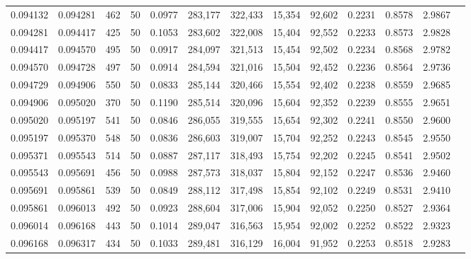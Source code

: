 \begin{tabular}{rrrrrrrrrrrrr}
0.094132 & 0.094281 &   462 &  50 &                                     0.0977 & 283,177 & 322,433 &  15,354 &  92,602 & 0.2231 & 0.8578 & 2.9867 \\
0.094281 & 0.094417 &   425 &  50 &                                     0.1053 & 283,602 & 322,008 &  15,404 &  92,552 & 0.2233 & 0.8573 & 2.9828 \\
0.094417 & 0.094570 &   495 &  50 &                                     0.0917 & 284,097 & 321,513 &  15,454 &  92,502 & 0.2234 & 0.8568 & 2.9782 \\
0.094570 & 0.094728 &   497 &  50 &                                     0.0914 & 284,594 & 321,016 &  15,504 &  92,452 & 0.2236 & 0.8564 & 2.9736 \\
0.094729 & 0.094906 &   550 &  50 &                                     0.0833 & 285,144 & 320,466 &  15,554 &  92,402 & 0.2238 & 0.8559 & 2.9685 \\
0.094906 & 0.095020 &   370 &  50 &                                     0.1190 & 285,514 & 320,096 &  15,604 &  92,352 & 0.2239 & 0.8555 & 2.9651 \\
0.095020 & 0.095197 &   541 &  50 &                                     0.0846 & 286,055 & 319,555 &  15,654 &  92,302 & 0.2241 & 0.8550 & 2.9600 \\
0.095197 & 0.095370 &   548 &  50 &                                     0.0836 & 286,603 & 319,007 &  15,704 &  92,252 & 0.2243 & 0.8545 & 2.9550 \\
0.095371 & 0.095543 &   514 &  50 &                                     0.0887 & 287,117 & 318,493 &  15,754 &  92,202 & 0.2245 & 0.8541 & 2.9502 \\
0.095543 & 0.095691 &   456 &  50 &                                     0.0988 & 287,573 & 318,037 &  15,804 &  92,152 & 0.2247 & 0.8536 & 2.9460 \\
0.095691 & 0.095861 &   539 &  50 &                                     0.0849 & 288,112 & 317,498 &  15,854 &  92,102 & 0.2249 & 0.8531 & 2.9410 \\
0.095861 & 0.096013 &   492 &  50 &                                     0.0923 & 288,604 & 317,006 &  15,904 &  92,052 & 0.2250 & 0.8527 & 2.9364 \\
0.096014 & 0.096168 &   443 &  50 &                                     0.1014 & 289,047 & 316,563 &  15,954 &  92,002 & 0.2252 & 0.8522 & 2.9323 \\
0.096168 & 0.096317 &   434 &  50 &                                     0.1033 & 289,481 & 316,129 &  16,004 &  91,952 & 0.2253 & 0.8518 & 2.9283 \\

\end{tabular}
